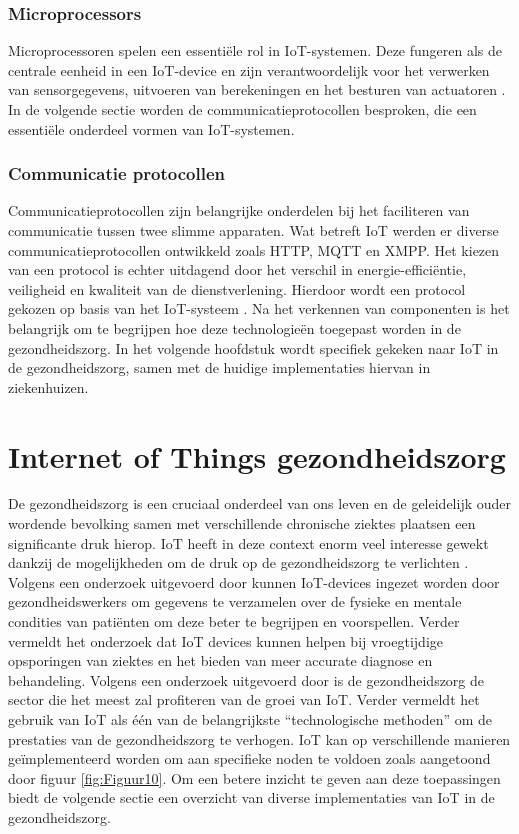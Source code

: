 \subsubsection{Microprocessors}
Microprocessoren spelen een essentiële rol in IoT-systemen. Deze fungeren als de centrale eenheid in een IoT-device en zijn verantwoordelijk voor het verwerken van sensorgegevens, uitvoeren van berekeningen en het besturen van actuatoren \autocite{Abraham2023, James2021}. In de volgende sectie worden de communicatieprotocollen besproken, die een essentiële onderdeel vormen van IoT-systemen.

\subsubsection{Communicatie protocollen}
Communicatieprotocollen zijn belangrijke onderdelen bij het faciliteren van communicatie tussen twee slimme apparaten. Wat betreft IoT werden er diverse communicatieprotocollen ontwikkeld zoals HTTP, MQTT en XMPP. Het kiezen van een protocol is echter uitdagend door het verschil in energie-efficiëntie, veiligheid en kwaliteit van de dienstverlening. Hierdoor wordt een protocol gekozen op basis van het IoT-systeem \autocite{Anitha2022, Jeddou2020}. Na het verkennen van componenten is het belangrijk om te begrijpen hoe deze technologieën toegepast worden in de gezondheidszorg. In het volgende hoofdstuk wordt specifiek gekeken naar IoT in de gezondheidszorg, samen met de huidige implementaties hiervan in ziekenhuizen. 


\section{Internet of Things gezondheidszorg}
De gezondheidszorg is een cruciaal onderdeel van ons leven en de geleidelijk ouder wordende bevolking samen met verschillende chronische ziektes plaatsen een significante druk hierop. IoT heeft in deze context enorm veel interesse gewekt dankzij de mogelijkheden om de druk op de gezondheidszorg te verlichten \autocite{Baker2017}. Volgens een onderzoek uitgevoerd door \autocite{Shiny2023} kunnen IoT-devices ingezet worden door gezondheidswerkers om gegevens te verzamelen over de fysieke en mentale condities van patiënten om deze beter te begrijpen en voorspellen. Verder vermeldt het onderzoek dat IoT devices kunnen helpen bij vroegtijdige opsporingen van ziektes en het bieden van meer accurate diagnose en behandeling. Volgens een onderzoek uitgevoerd door \autocite{Li2024} is de gezondheidszorg de sector die het meest zal profiteren van de groei van IoT. Verder vermeldt \autocite{Tavakoli2017} het gebruik van IoT als één van de belangrijkste “technologische methoden” om de prestaties van de gezondheidszorg te verhogen. IoT kan op verschillende manieren geïmplementeerd worden om aan specifieke noden te voldoen zoals aangetoond door figuur \ref{fig:Figuur10}. Om een betere inzicht te geven aan deze toepassingen biedt de volgende sectie een overzicht van diverse implementaties van IoT in de gezondheidszorg.

